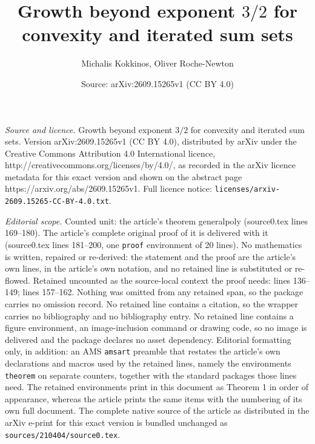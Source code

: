 \documentclass[10pt,a4paper]{amsart}
\title{Growth beyond exponent $3/2$ for convexity and iterated sum sets}
\author{Michalis Kokkinos, Oliver Roche-Newton}
\date{Source: arXiv:2609.15265v1 (CC BY 4.0)}
\begin{document}
\maketitle

\noindent\emph{Source and licence.} Growth beyond exponent $3/2$ for convexity and iterated sum sets. Version arXiv:2609.15265v1 (CC BY 4.0), distributed by arXiv under the Creative Commons Attribution 4.0 International licence, http://creativecommons.org/licenses/by/4.0/, as recorded in the arXiv licence metadata for this exact version and shown on the abstract page https://arxiv.org/abs/2609.15265v1. Full licence notice: \texttt{licenses/arxiv-2609.15265-CC-BY-4.0.txt}.\par\smallskip

\noindent\textit{Editorial scope.} Counted unit: the article's theorem generalpoly (source0.tex lines 169--180). The article's complete original proof of it is delivered with it (source0.tex lines 181--200, one \texttt{proof} environment of 20 lines). No mathematics is written, repaired or re-derived: the statement and the proof are the article's own lines, in the article's own notation, and no retained line is substituted or re-flowed.  Retained uncounted as the source-local context the proof needs: lines 136--149; lines 157--162.  Nothing was omitted from any retained span, so the package carries no omission record.  No retained line contains a citation, so the wrapper carries no bibliography and no bibliography entry.  No retained line contains a figure environment, an image-inclusion command or drawing code, so no image is delivered and the package declares no asset dependency.  Editorial formatting only, in addition: an AMS \texttt{amsart} preamble that restates the article's own declarations and macros used by the retained lines, namely the environments \texttt{theorem} on separate counters, together with the standard packages those lines need.  The retained environments print in this document as Theorem 1 in order of appearance, whereas the article prints the same items with the numbering of its own full document.  The complete native source of the article as distributed in the arXiv e-print for this exact version is bundled unchanged as \texttt{sources/210404/source0.tex}.
\end{document}

